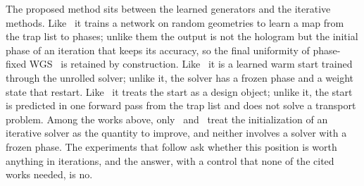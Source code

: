 The proposed method sits between the learned generators and the iterative methods. Like~\cite{eybposh,ren} it trains a network on random geometries to learn a map from the trap list to phases; unlike them the output is not the hologram but the initial phase of an iteration that keeps
its accuracy, so the final uniformity of phase-fixed WGS~\cite{kim2019} is retained by construction. Like~\cite{sambharya} it is a learned warm start trained through the unrolled solver; unlike it, the solver has a frozen phase and a weight state that restart. Like~\cite{swan} it treats the start as a design object; unlike it, the start is predicted in one forward
pass from the trap list and does not solve a transport problem. Among the works above, only~\cite{sambharya} and~\cite{swan} treat the initialization of an iterative solver as the quantity to improve, and neither involves a solver with a frozen phase. The experiments that follow ask whether this position is worth anything in iterations, and the answer, with a control that none of the cited works needed, is no.
